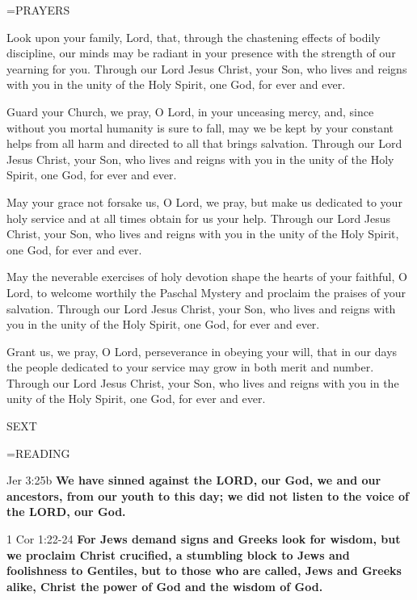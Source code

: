 \hangindent=\parindent \small PRAYERS
\begin{description}[labelindent=\parindent, leftmargin=*]
\item [Week 1:] 	Look upon your family, Lord, that, through the chastening effects of bodily discipline, our minds may be radiant in your presence with the strength of our yearning for you. Through our Lord Jesus Christ, your Son, who lives and reigns with you in the unity of the Holy Spirit, one God, for ever and ever.
\item [Week 2:] 	Guard your Church, we pray, O Lord, in your unceasing mercy, and, since without you mortal humanity is sure to fall, may we be kept by your constant helps from all harm and directed to all that brings salvation. Through our Lord Jesus Christ, your Son, who lives and reigns with you in the unity of the Holy Spirit, one God, for ever and ever.
\item [Week 3:] 	May your grace not forsake us, O Lord, we pray, but make us dedicated to your holy service and at all times obtain for us your help. Through our Lord Jesus Christ, your Son, who lives and reigns with you in the unity of the Holy Spirit, one God, for ever and ever.
\item [Week 4:] 	May the neverable exercises of holy devotion shape the hearts of your faithful, O Lord, to welcome worthily the Paschal Mystery and proclaim the praises of your salvation. Through our Lord Jesus Christ, your Son, who lives and reigns with you in the unity of the Holy Spirit, one God, for ever and ever.
\item [Week 5:] 	Grant us, we pray, O Lord, perseverance in obeying your will, that in our days the people dedicated to your service may grow in both merit and number. Through our Lord Jesus Christ, your Son, who lives and reigns with you in the unity of the Holy Spirit, one God, for ever and ever.
\end{description}

\begin{flushleft}\normalsize SEXT\\\end{flushleft}

\hangindent=\parindent \small READING
\begin{description}[labelindent=\parindent, leftmargin=*]
\item [Weeks 1-4:]     Jer 3:25b \textbf{    We have sinned against the LORD, our God, we and our ancestors, from our youth to this day; we did not listen to the voice of the LORD, our God.\\}
\item [Week 5:]     1 Cor 1:22-24 \textbf{    For Jews demand signs and Greeks look for wisdom, but we proclaim Christ crucified, a stumbling block to Jews and foolishness to Gentiles, but to those who are called, Jews and Greeks alike, Christ the power of God and the wisdom of God. \\}
\end{description}

